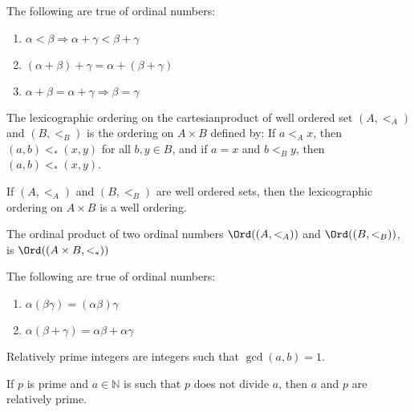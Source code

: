         \begin{theorem}
           The following are true of ordinal numbers:
           \begin{enumerate}
                \item $\alpha<\beta\Rightarrow\alpha+\gamma<\beta+\gamma$
                \item $(\alpha+\beta)+\gamma=\alpha+(\beta+\gamma)$
                \item $\alpha+\beta=\alpha+\gamma\Rightarrow\beta=\gamma$
           \end{enumerate}
        \end{theorem}
        \begin{definition}
            The lexicographic ordering on the cartesianproduct of well
            ordered set $(A,<_{A})$ and $(B,<_{B})$ is the ordering on
            ${A}\times{B}$ defined by: If ${a}<_{A}{x}$, then
            $(a,b)<_{*}(x,y)$ for all $b,y\in{B}$, and if $a=x$ and
            $b<_{B}y$, then $(a,b)<_{*}(x,y)$.
        \end{definition}
        \begin{theorem}
            If $(A,<_{A})$ and $(B,<_{B})$ are well ordered sets, then the
            lexicographic ordering on ${A}\times{B}$ is a well ordering.
        \end{theorem}
        \begin{definition}
            The ordinal product of two ordinal numbers
            $\Ord((A,<_{A}))$ and $\Ord((B,<_{B}))$,
            is $\Ord(({A}\times{B},<_{*}))$
        \end{definition}
        \begin{theorem}
            The following are true of ordinal numbers:
            \begin{enumerate}
                \item $\alpha(\beta\gamma)=(\alpha\beta)\gamma$
                \item $\alpha(\beta+\gamma)=\alpha\beta+\alpha\gamma$
            \end{enumerate}
        \end{theorem}
        \begin{definition}
           Relatively prime integers are integers such that $\gcd(a,b)=1$.
        \end{definition}
        \begin{theorem}
           If $p$ is prime and $a\in\mathbb{N}$ is
           such that $p$ does not divide $a$, then $a$ and $p$
           are relatively prime.
        \end{theorem}
